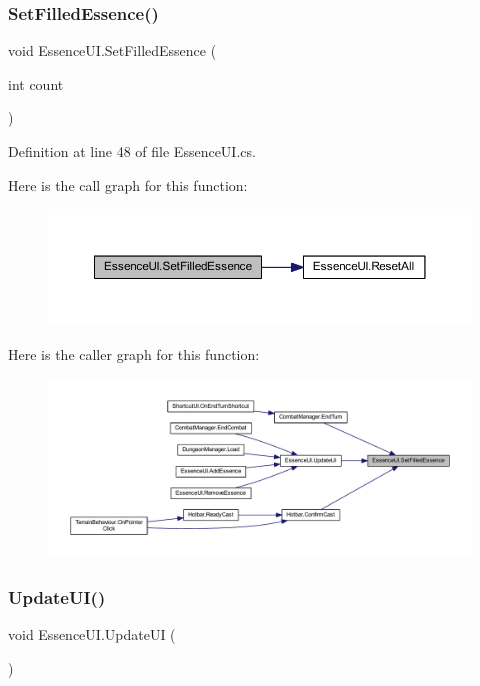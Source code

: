 \subsubsection{\texorpdfstring{SetFilledEssence()}{SetFilledEssence()}}
{\footnotesize\ttfamily void Essence\+U\+I.\+Set\+Filled\+Essence (\begin{DoxyParamCaption}\item[{int}]{count }\end{DoxyParamCaption})}



Definition at line 48 of file Essence\+U\+I.\+cs.

Here is the call graph for this function\+:
\nopagebreak
\begin{figure}[H]
\begin{center}
\leavevmode
\includegraphics[width=350pt]{class_essence_u_i_aac12f1c82310ceb94e259d9b6aa9bdfd_cgraph}
\end{center}
\end{figure}
Here is the caller graph for this function\+:
\nopagebreak
\begin{figure}[H]
\begin{center}
\leavevmode
\includegraphics[width=350pt]{class_essence_u_i_aac12f1c82310ceb94e259d9b6aa9bdfd_icgraph}
\end{center}
\end{figure}
\mbox{\label{class_essence_u_i_a26023c3d4977188014384a1a40eb3ad9}} 
\subsubsection{\texorpdfstring{UpdateUI()}{UpdateUI()}}
{\footnotesize\ttfamily void Essence\+U\+I.\+Update\+UI (\begin{DoxyParamCaption}{ }\end{DoxyParamCaption})}



